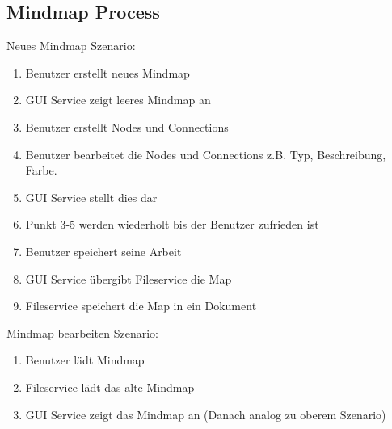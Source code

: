 \subsection{Mindmap Process}
\label{subsec:mindmap_process}
Neues Mindmap Szenario:
\begin{enumerate}
\item Benutzer erstellt neues Mindmap
\item GUI Service zeigt leeres Mindmap an
\item Benutzer erstellt Nodes und Connections 
\item Benutzer bearbeitet die Nodes und Connections z.B. Typ, Beschreibung, Farbe.
\item GUI Service stellt dies dar
\item Punkt 3-5 werden wiederholt bis der Benutzer zufrieden ist
\item Benutzer speichert seine Arbeit
\item GUI Service übergibt Fileservice die Map
\item Fileservice speichert die Map in ein Dokument
\end{enumerate}

Mindmap bearbeiten Szenario: 
\begin{enumerate}
\item Benutzer lädt Mindmap
\item Fileservice lädt das alte Mindmap
\item GUI Service zeigt das Mindmap an (Danach analog zu oberem Szenario)
\end{enumerate}

